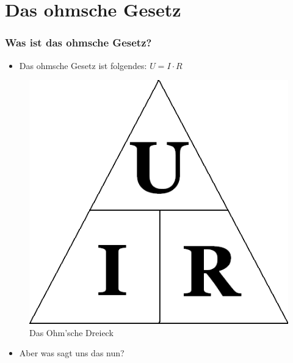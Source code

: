 


\subtitle{Technik Klasse E 03 \\
Ohmsches Gesetz, Leistung \& Arbeit \\[2em]}
\date{Stand 25.09.2017}


\section{Das ohmsche Gesetz}

\begin{frame}
  \frametitle{Was ist das ohmsche Gesetz?}
  \begin{itemize}
    \item Das ohmsche Gesetz ist folgendes: $U = I \cdot R$
  \end{itemize}
  \begin{center}
    \begin{figure}
      \includegraphics[width=\textwidth,height=.7\textheight,keepaspectratio]{e03/Ohm_law_triangle.png}
      \caption{Das Ohm'sche Dreieck \cite{dreieck}}
      \label{fig_dreieck}
    \end{figure}
  \end{center}
  \begin{itemize}
    \item Aber was sagt uns das nun?
  \end{itemize}
\end{frame}

